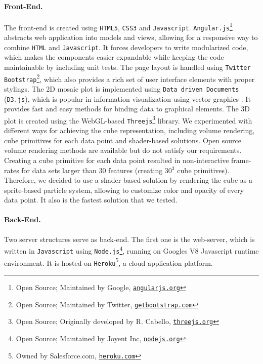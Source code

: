 \documentclass[journal]{style/vgtc} 			          %
\begin{document}
\paragraph{Front-End.}
The front-end is created using \texttt{HTML5}, \texttt{CSS3} and \texttt{Javascript}.
\texttt{Angular.js}\footnote{Open Source; Maintained by Google, \href{https://www.angularjs.org/}{\texttt{angularjs.org}}} abstracts web application into models and views, allowing for a responsive way to combine \texttt{HTML} and \texttt{Javascript}.
It forces developers to write modularized code, which makes the components easier expandable while keeping the code maintainable by including unit tests.
The page layout is handled using \texttt{Twitter Bootstrap}\footnote{Open Source; Maintained by Twitter, \href{http://getbootstrap.com}{\texttt{getbootstrap.com}}}, which also provides a rich set of user interface elements with proper stylings.
The 2D mosaic plot is implemented using \texttt{Data driven Documents} (\texttt{D3.js}), which is popular in information visualization using vector graphics \cite{D3}.
It provides fast and easy methods for binding data to graphical elements.
The 3D plot is created using the WebGL-based \texttt{Threejs}\footnote{Open Source; Originally developed by R. Cabello, \href{http://threejs.org}{\texttt{threejs.org}}} library.
We experimented with different ways for achieving the cube representation, including volume rendering, cube primitives for each data point and shader-based solutions.
Open source volume rendering methods are available but do not satisfy our requirements.
Creating a cube primitive for each data point resulted in non-interactive frame-rates for data sets larger than 30 features (creating 30$^3$ cube primitives).
Therefore, we decided to use a shader-based solution by rendering the cube as a sprite-based particle system, allowing to customize color and opacity of every data point.
It also is the fastest solution that we tested.

\paragraph{Back-End.}
Two server structures serve as back-end.
The first one is the web-server, which is written in \texttt{Javascript} using \texttt{Node.js}\footnote{Open Source; Maintained by Joyent Inc, \href{http://nodejs.org}{\texttt{nodejs.org}}}, running on Googles V8 Javascript runtime environment.
It is hosted on \texttt{Heroku}\footnote{Owned by Salesforce.com, \href{https://www.heroku.com/}{\texttt{heroku.com}}}, a cloud application platform.
\end{document}
